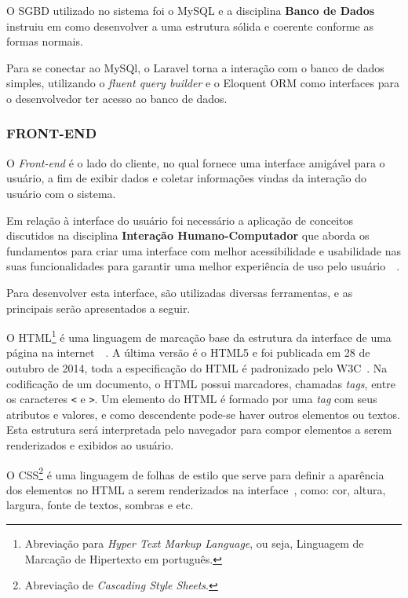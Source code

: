 \documentclass[
  12pt,				%
  openany,
  oneside,
  a4paper,			%
  english,			%
  brazil
]{article}
\numberwithin{figure}{section}
\numberwithin{table}{section}
\newcounter{subsubsubsection}[subsubsection]
\begin{document}
O SGBD utilizado no sistema foi o MySQL e a disciplina \textbf{Banco de Dados} instruiu em como desenvolver a uma estrutura sólida e coerente conforme as formas normais.

Para se conectar ao MySQl, o Laravel torna a interação com o banco de dados simples, utilizando o \textit{fluent query builder} e o Eloquent ORM como interfaces para o desenvolvedor ter acesso ao banco de dados.





\subsubsection{FRONT-END}
O \textit{Front-end} é o lado do cliente, no qual fornece uma interface amigável para o usuário, a fim de exibir dados e coletar informações vindas da interação do usuário com o sistema.

Em relação à interface do usuário foi necessário a aplicação de conceitos discutidos na disciplina \textbf{Interação Humano-Computador} que aborda os fundamentos para criar uma interface com melhor acessibilidade e usabilidade nas suas funcionalidades para garantir uma melhor experiência de uso pelo usuário~\cite{IHC_benyon}~\cite{IHC_preece}.

Para desenvolver esta interface, são utilizadas diversas ferramentas, e as principais serão apresentados a seguir.


O HTML\footnote{Abreviação para \textit{Hyper Text Markup Language}, ou seja, Linguagem de Marcação de Hipertexto em português.} é uma linguagem de marcação base da estrutura da interface de uma página na internet~\cite{Novatec_css_html}~\cite{PHP_Novatec_dev}. A última versão é o HTML5 e foi publicada em 28 de outubro de 2014, toda a especificação do HTML é padronizado pelo W3C~\cite{w3c}.
Na codificação de um documento, o HTML possui marcadores, chamadas \textit{tags}, entre os caracteres \texttt{<} e \texttt{>}. Um elemento do HTML é formado por uma \textit{tag} com seus atributos e valores, e como descendente pode-se haver outros elementos ou textos. Esta estrutura será interpretada pelo navegador para compor elementos a serem renderizados e exibidos ao usuário.




O CSS\footnote{Abreviação de \textit{Cascading Style Sheets}.} é uma linguagem de folhas de estilo que serve para definir a aparência dos elementos no HTML a serem renderizados na interface~\cite{Novatec_css_html}, como: cor, altura, largura, fonte de textos, sombras e etc.
\end{document}
